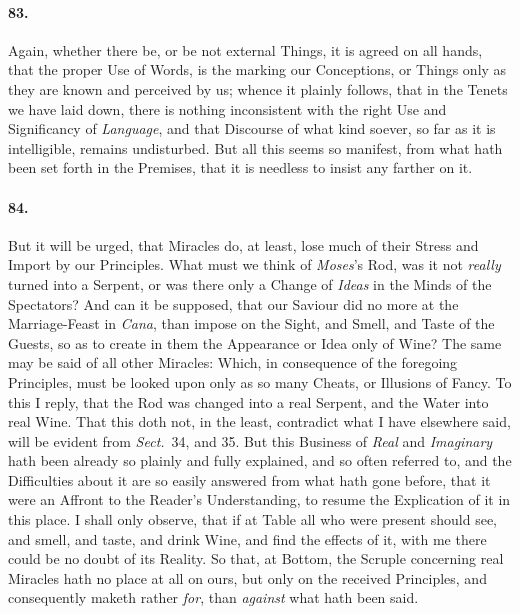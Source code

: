\documentclass[]{article}
\newenvironment{sectionbody}{}{}
\begin{document}
\begin{sectionbody}
\paragraph{83.} Again, whether there be, or be not external Things, it is agreed
on all hands, that the proper Use of Words, is the marking our
Conceptions, or Things only as they are known and perceived by
us; whence it plainly follows, that in the Tenets we have laid
down, there is nothing inconsistent with the right Use and
Significancy of \emph{Language}, and that Discourse of what
kind soever, so far as it is intelligible, remains undisturbed.
But all this seems so manifest, from what hath been set forth in
the Premises, that it is needless to insist any farther on it.



\paragraph{84.} But it will be urged, that Miracles do, at least, lose much of
their Stress and Import by our Principles.  What must we think of
\emph{Moses}'s Rod, was it not \emph{really} turned into a
Serpent, or was there only a Change of \emph{Ideas} in the
Minds of the Spectators?  And can it be supposed, that our
Saviour did no more at the Marriage-Feast in \emph{Cana}, than
impose on the Sight, and Smell, and Taste of the Guests, so as to
create in them the Appearance or Idea only of Wine? The same may
be said of all other Miracles: Which, in consequence of the
foregoing Principles, must be looked upon only as so many Cheats,
or Illusions of Fancy.  To this I reply, that the Rod was changed
into a real Serpent, and the Water into real Wine.  That this
doth not, in the least, contradict what I have elsewhere said,
will be evident from \emph{Sect.}\ 34, and 35.
But this Business of \emph{Real} and \emph{Imaginary} hath
been already so plainly and fully explained, and so often
referred to, and the Difficulties about it are so easily answered
from what hath gone before, that it were an Affront to the
Reader's Understanding, to resume the Explication of it in this
place.  I shall only observe, that if at Table all who were
present should see, and smell, and taste, and drink Wine, and
find the effects of it, with me there could be no doubt of its
Reality.  So that, at Bottom, the Scruple concerning real
Miracles hath no place at all on ours, but only on the received
Principles, and consequently maketh rather \emph{for}, than
\emph{against} what hath been said.




\end{sectionbody}
\end{document}
